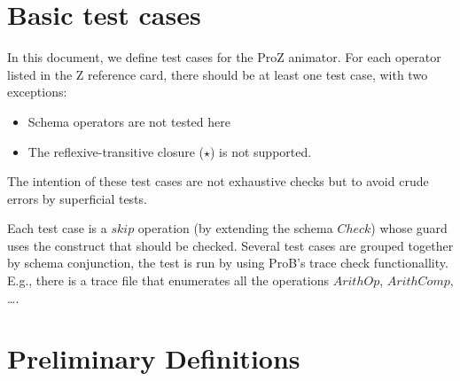 \documentclass{article}
\begin{document}
\section*{\huge Basic test cases}
In this document, we define test cases for the ProZ animator.
For each operator listed in the Z reference card, there should be
at least one test case, with two exceptions:
\begin{itemize}
\item Schema operators are not tested here
\item The reflexive-transitive closure ($\star$) is not supported.
\end{itemize}
The intention of these test cases are not exhaustive checks but
to avoid crude errors by superficial tests.

Each test case is a $skip$ operation (by extending the schema $Check$)
whose guard uses the construct that should be checked.
Several test cases are grouped together by schema conjunction,
the test is run by using ProB's trace check functionallity.
E.g., there is a trace file that enumerates all the operations
$ArithOp$, $ArithComp$, \ldots.

\section{Preliminary Definitions}
\end{document}
